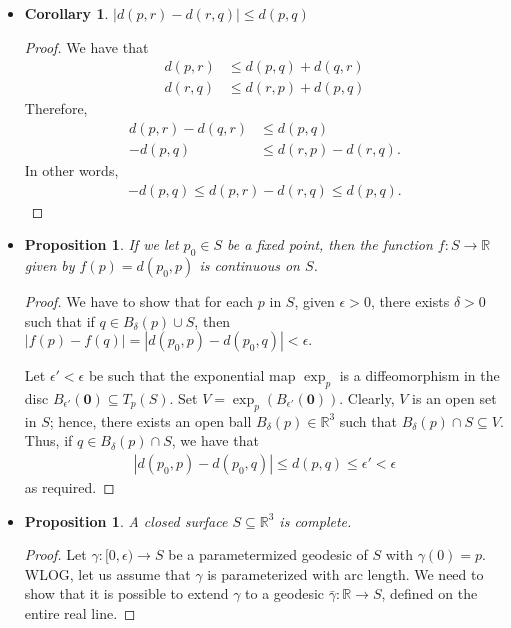 \documentclass[10pt]{article}
\newtheorem{proposition}[lemma]{Proposition}
\newtheorem{corollary}[lemma]{Corollary}
\newcommand{\ve}[1]{\mathbf{#1}}
\newcommand{\ra}{\rightarrow}
\newcommand{\Real}{\mathbb{R}}
\newcommand{\sseq}{\subseteq}
\begin{document}
\begin{itemize}
    \item \begin{corollary}
      $|d(p,r) - d(r,q)| \leq d(p,q)$
    \end{corollary}
    \begin{proof}
      We have that
      \begin{align*}
        d(p,r) &\leq d(p,q) + d(q,r)\\
        d(r,q) &\leq d(r,p) + d(p,q)
      \end{align*}
      Therefore,
      \begin{align*}
        d(p,r) - d(q,r) &\leq d(p,q)\\
        -d(p,q) &\leq d(r,p) - d(r,q).
      \end{align*}
      In other words,
      \begin{align*}
        -d(p,q) \leq d(p,r) - d(r,q) \leq d(p,q).
      \end{align*}
    \end{proof}

    \item \begin{proposition}
      If we let $p_0 \in S$ be a fixed point, then the function $f: S \ra \Real$ given by $f(p) = d(p_0,p)$ is continuous on $S$.
    \end{proposition}
    \begin{proof}
      We have to show that for each $p$ in $S$, given $\epsilon > 0$, there exists $\delta > 0$ such that if $q \in B_\delta(p) \cup S$, then $|f(p) - f(q)| = |d(p_0, p) - d(p_0, q)| < \epsilon.$

      Let $\epsilon' < \epsilon$ be such that the exponential map $\exp_p$ is a diffeomorphism in the disc $B_{\epsilon'}(\ve{0}) \sseq T_p(S)$. Set $V = \exp_p(B_{\epsilon'}(\ve{0}))$. Clearly, $V$ is an open set in $S$; hence, there exists an open ball $B_\delta(p) \in \Real^3$ such that $B_\delta(p) \cap S \sseq V$. Thus, if $q \in B_{\delta}(p) \cap S$, we have that
      \begin{align*}
        |d(p_0,p) - d(p_0,q)| \leq d(p,q) \leq \epsilon' < \epsilon
      \end{align*}
      as required.
    \end{proof}

    \item \begin{proposition}
      A closed surface $S \sseq \Real^3$ is complete.
    \end{proposition}
    \begin{proof}
      Let $\gamma: [0, \epsilon) \ra S$ be a parametermized geodesic of $S$ with $\gamma(0) = p$. WLOG, let us assume that $\gamma$ is parameterized with arc length. We need to show that it is possible to extend $\gamma$ to a geodesic $\bar \gamma : \Real \ra S$, defined on the entire real line.


\end{proof}
\end{itemize}
\end{document}
